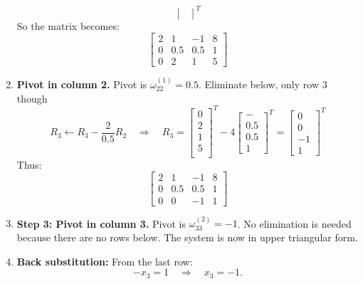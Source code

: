 \documentclass[../../../main.tex]{subfiles}
\begin{document}
\begin{enumerate}
\begin{equation*}
\begin{bmatrix}
              \end{bmatrix}^{T}
          \end{equation*}
          So the matrix becomes:
          \begin{equation*}
              \begin{bmatrix}
                  2 & 1   & -1  & 8 \\
                  0 & 0.5 & 0.5 & 1 \\
                  0 & 2   & 1   & 5
              \end{bmatrix}
          \end{equation*}
    \item \textbf{Pivot in column 2.}
          Pivot is $\omega_{22}^{(1)} = 0.5$.
          Eliminate below, only row 3 though
          \begin{equation*}
              R_3 \leftarrow R_3 - \frac{2}{0.5} R_2 \quad \Rightarrow \quad
              R_3=
              \begin{bmatrix}
                  0 \\2\\1\\5\\
              \end{bmatrix}^{T}
              -4
              \begin{bmatrix}
                  - \\0.5\\0.5\\1
              \end{bmatrix}^{T}
              =
              \begin{bmatrix}
                  0 \\0\\-1\\1
              \end{bmatrix}^{T}
          \end{equation*}
          Thus:
          \begin{equation*}
              \begin{bmatrix}
                  2 & 1   & -1  & 8 \\
                  0 & 0.5 & 0.5 & 1 \\
                  0 & 0   & -1  & 1
              \end{bmatrix}
          \end{equation*}

    \item \textbf{Step 3: Pivot in column 3.}
          Pivot is $\omega_{33}^{(2)} = -1$. No elimination is needed because there are no rows below.
          The system is now in upper triangular form.
    \item \textbf{Back substitution:}
          From the last row:
          \begin{equation*}
              - x_3 = 1 \quad \Rightarrow \quad x_3 = -1.
          \end{equation*}


\end{enumerate}
\end{document}
